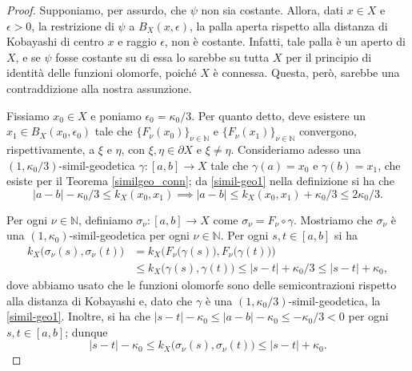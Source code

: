 \begin{proof}
    Supponiamo, per assurdo, che $\psi$ non sia costante. Allora, dati $x \in X$ e $\epsilon>0$, la restrizione di $\psi$ a $B_X(x,\epsilon)$, la palla aperta rispetto alla distanza di Kobayashi di centro $x$ e raggio $\epsilon$, non è costante. Infatti, tale palla è un aperto di $X$, e se $\psi$ fosse costante su di essa lo sarebbe su tutta $X$ per il principio di identità delle funzioni olomorfe, poiché $X$ è connessa. Questa, però, sarebbe una contraddizione alla nostra assunzione.

    Fissiamo $x_0 \in X$ e poniamo $\epsilon_0=\kappa_0/3$. Per quanto detto, deve esistere un $x_1 \in B_X(x_0,\epsilon_0)$ tale che $\{F_\nu(x_0)\}_{\nu\in\mathbb{N}}$ e $\{F_\nu(x_1)\}_{\nu\in\mathbb{N}}$ convergono, rispettivamente, a $\xi$ e $\eta$, con $\xi,\eta \in \partial X$ e $\xi\not=\eta$. Consideriamo adesso una $(1,\kappa_0/3)$-simil-geodetica $\gamma:[a,b]\longrightarrow X$ tale che $\gamma(a)=x_0$ e $\gamma(b)=x_1$, che esiste per il Teorema \ref{similgeo_conn}; da \eqref{simil-geo1} nella definizione si ha che
    $$|a-b|-\kappa_0/3 \le k_X(x_0,x_1) \implies |a-b| \le k_X(x_0,x_1)+\kappa_0/3 \le 2\kappa_0/3.$$

    Per ogni $\nu\in\mathbb{N}$, definiamo $\sigma_\nu:[a,b]\longrightarrow X$ come $\sigma_\nu=F_\nu\circ\gamma$. Mostriamo che $\sigma_\nu$ è una $(1,\kappa_0)$-simil-geodetica per ogni $\nu\in\mathbb{N}$. Per ogni $s,t \in [a,b]$ si ha
    \begin{align*}k_X\big(\sigma_\nu(s),\sigma_\nu(t)\big)&=k_X\Big(F_\nu\big(\gamma(s)\big),F_\nu\big(\gamma(t)\big)\Big)\\
        &\le k_X\big(\gamma(s),\gamma(t)\big) \le |s-t|+\kappa_0/3 \le |s-t|+\kappa_0,
    \end{align*}
    dove abbiamo usato che le funzioni olomorfe sono delle semicontrazioni rispetto alla distanza di Kobayashi e, dato che $\gamma$ è una $(1,\kappa_0/3)$-simil-geodetica, la \eqref{simil-geo1}. Inoltre, si ha che $|s-t|-\kappa_0 \le |a-b|-\kappa_0 \le -\kappa_0/3<0$ per ogni $s,t \in [a,b]$; dunque
    \begin{equation} \label{snu1}
        |s-t|-\kappa_0 \le k_X\big(\sigma_\nu(s),\sigma_\nu(t)\big) \le |s-t|+\kappa_0.
    \end{equation}


\end{proof}
